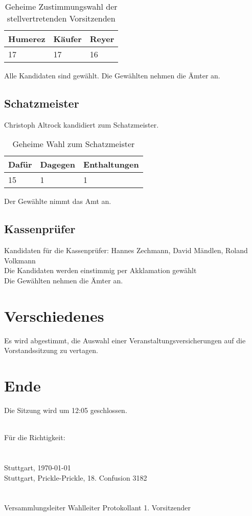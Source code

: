 \documentclass[a4paper]{scrartcl}
\begin{document}
\begin{table}[h]
	\begin{tabularx}{\textwidth}{XXX}
		Humerez & Käufer & Reyer\\
		\toprule
		17 & 17 & 16 \\
	\end{tabularx}
	\caption{Geheime Zustimmungswahl der stellvertretenden Vorsitzenden}
\end{table}
Alle Kandidaten sind gewählt. Die Gewählten nehmen die Ämter an.

\subsection{Schatzmeister}
Christoph Altrock kandidiert zum Schatzmeister.

\begin{table}[h]
	\begin{tabularx}{\textwidth}{XXX}
		Dafür & Dagegen & Enthaltungen\\
		\toprule
		15 & 1 & 1\\
	\end{tabularx}
	\caption{Geheime Wahl zum Schatzmeister}
\end{table}
Der Gewählte nimmt das Amt an.

\subsection{Kassenprüfer}
Kandidaten für die Kassenprüfer: Hannes Zechmann, David Mändlen, Roland Volkmann\\
Die Kandidaten werden einstimmig per Akklamation gewählt\\
Die Gewählten nehmen die Ämter an.

\clearpage

\section{Verschiedenes }

Es wird abgestimmt, die Auswahl einer Veranstaltungsversicherungen auf die Vorstandssitzung zu vertagen.\\

\section{Ende}

Die  Sitzung wird um 12:05 geschlossen.

\vfill
\mbox{}\\
Für die Richtigkeit:\\
\\
\\
Stuttgart, \today\\
Stuttgart, Prickle-Prickle, 18. Confusion 3182\\
\\
\\
\hfill Versammlungsleiter \hfill Wahlleiter \hfill Protokollant \hfill 1. Vorsitzender \hfill
\end{document}
